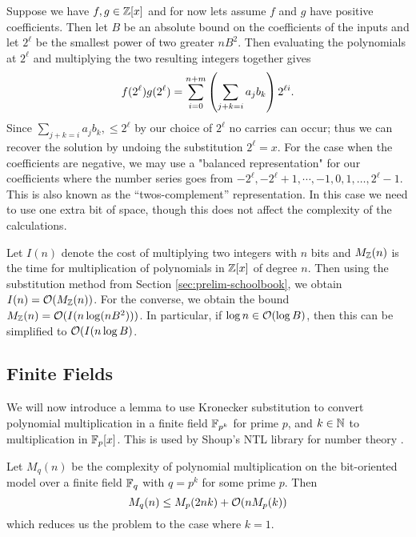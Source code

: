 Suppose we have $f,g \in {\mathbb Z}[x]$ and for now lets assume $f$ and $g$ have positive coefficients. Then let $B$ be an absolute bound on the coefficients of the inputs and let $2^\ell$ be the smallest power of two greater $nB^2$. Then evaluating the polynomials at $2^\ell$ and multiplying the two resulting integers together gives
\[
    f(2^\ell)g(2^\ell) = \sum^{n+m}_{i=0} \left(\sum_{j + k = i} a_jb_k\right)2^{\ell i}.
\]
Since $\sum_{j + k = i}a_j b_k,\leq 2^{\ell}$ by our choice of $2^\ell$ no carries can occur; thus we can recover the solution by undoing the substitution $2^\ell = x$. For the case when the coefficients are negative, we may use a "balanced representation" for our coefficients where the number series goes from $-2^\ell, -2^\ell + 1, \cdots, -1, 0, 1, \ldots, 2^\ell - 1$. This is also known as the ``twos-complement'' representation. In this case we need to use one extra bit of space, though this does not affect the complexity of the calculations.

Let $I(n)$ denote the cost of multiplying two integers with $n$ bits and $M_{\mathbb Z}(n)$ is the time for multiplication of polynomials in ${\mathbb Z}[x]$ of degree $n$. Then using the substitution method from Section \ref{sec:prelim-schoolbook}, we obtain $I(n) = \mathcal O(M_{\mathbb Z}(n))$. For the converse, we obtain the bound $M_{\mathbb Z}(n) = \mathcal O(I(n\log (nB^2)))$. In particular, if $\log n \in \mathcal O(\log B)$, then this can be simplified to $\mathcal O(I(n \log B)$.

\subsection{Finite Fields}%
\label{sub:finite-field}

We will now introduce a lemma to use Kronecker substitution to convert polynomial multiplication in a finite field ${\mathbb F}_{p^k}$ for prime $p$, and $k\in {\mathbb N}$ to multiplication in ${\mathbb F}_p [x]$. This is used by Shoup's NTL library for number theory \cite{ntl}.

\begin{lemma}
    Let $M_q(n)$ be the complexity of polynomial multiplication on the bit-oriented model over a finite field ${\mathbb F}_q$ with $q = p^k$ for some prime $p$. Then
    \[
        M_q(n) \leq M_p(2nk) + \mathcal O(n M_p(k))
    \]
    which reduces us the problem to the case where $k = 1$.
\end{lemma}

